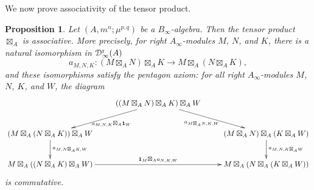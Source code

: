 \documentclass[a4paper, 11pt]{amsart}
\newtheorem{prop}[thm]{Proposition}
\theoremstyle{definition}
\theoremstyle{remark}
\numberwithin{equation}{section}
\newcommand{\RR}{\mathrm{r}}
\newcommand{\id}{\mathbf{1}}
\newcommand{\ED}{\EuScript{D}}
\begin{document}
We now prove associativity of the tensor product.
\begin{prop}\label{prop:asso-rightmodule}
Let $(A,m^n;\mu^{p,q})$ be a $B_\infty$-algebra. Then the tensor product $\boxtimes_A$ is associative. More precisely, for right $A_\infty$-modules $M$, $N$, and $K$, there is a natural isomorphism in $\ED^{\RR}_\infty(A)$
$$a_{M,N,K}\colon (M \boxtimes_A N)\boxtimes_A K \rightarrow M \boxtimes_A (N\boxtimes_A K),$$
and these isomorphisms satisfy the pentagon axiom: for all right $A_\infty$-modules $M$, $N$, $K$, and $W$, the diagram
\[
\xymatrix{
& ((M\boxtimes_A N)\boxtimes_A K)\boxtimes_A W \ar[dl]^{\; a_{M,N,K}\boxtimes_A \id_W}\ar[rd]_{a_{M\boxtimes_A N, K, W}\quad} & \\
(M\boxtimes_A (N \boxtimes_A K))\ar[d]^{a_{M, N\boxtimes_A K, W}} \boxtimes_A W & & (M\boxtimes_A N) \boxtimes_A (K \boxtimes_A W)\ar[d]^{a_{M, N, K\boxtimes_A W}} \\
M\boxtimes_A ((N \boxtimes_A K) \boxtimes_A W)\ar[rr]^{\id_M\boxtimes_A a_{N,K,W}} & & M\boxtimes_A (N \boxtimes_A( K \boxtimes_A W))
 }
\]
is commutative.
\end{prop}
\end{document}
